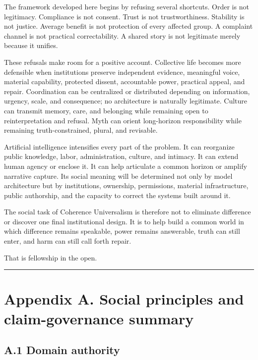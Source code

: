 \documentclass[
  11pt,
]{article}
\begin{document}
The framework developed here begins by refusing several shortcuts. Order
is not legitimacy. Compliance is not consent. Trust is not
trustworthiness. Stability is not justice. Average benefit is not
protection of every affected group. A complaint channel is not practical
correctability. A shared story is not legitimate merely because it
unifies.

These refusals make room for a positive account. Collective life becomes
more defensible when institutions preserve independent evidence,
meaningful voice, material capability, protected dissent, accountable
power, practical appeal, and repair. Coordination can be centralized or
distributed depending on information, urgency, scale, and consequence;
no architecture is naturally legitimate. Culture can transmit memory,
care, and belonging while remaining open to reinterpretation and
refusal. Myth can orient long-horizon responsibility while remaining
truth-constrained, plural, and revisable.

Artificial intelligence intensifies every part of the problem. It can
reorganize public knowledge, labor, administration, culture, and
intimacy. It can extend human agency or enclose it. It can help
articulate a common horizon or amplify narrative capture. Its social
meaning will be determined not only by model architecture but by
institutions, ownership, permissions, material infrastructure, public
authorship, and the capacity to correct the systems built around it.

The social task of Coherence Universalism is therefore not to eliminate
difference or discover one final institutional design. It is to help
build a common world in which difference remains speakable, power
remains answerable, truth can still enter, and harm can still call forth
repair.

That is fellowship in the open.

\begin{center}\rule{0.5\linewidth}{0.5pt}\end{center}

\section{Appendix A. Social principles and claim-governance
summary}\label{appendix-a.-social-principles-and-claim-governance-summary}

\subsection{A.1 Domain authority}\label{a.1-domain-authority}
\end{document}
